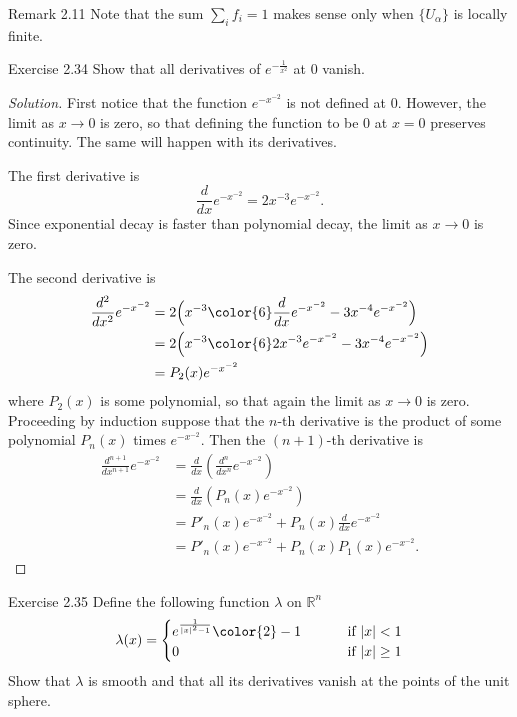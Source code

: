 \begin{thing5}{Remark 2.11}\label{rk:2.11}\leavevmode
Note that the sum \(\sum_if_i=1\) makes sense only when \(\{U_\alpha\}\) is locally finite.
\end{thing5}

\begin{thing4}{Exercise 2.34}\label{exer:2.34}\leavevmode
Show that all derivatives of \(e^{-\frac{1}{x^2}}\) at 0 vanish.
\end{thing4}

\begin{proof}[Solution]\leavevmode
	First notice that the function \(e^{-x^{-2}}\) is not defined at 0. However, the limit as \(x \to 0\) is zero, so that defining the function to be 0 at \(x=0\) preserves continuity. The same will happen with its derivatives.

	The first derivative is
	\[\frac{d}{dx}e^{-x^{-2}}=2x^{-3}e^{-x^{-2}}.\]
Since exponential decay is faster than polynomial decay, the limit as \(x \to 0\) is zero.

	The second derivative is
\begin{align*}
	\frac{d^2}{dx^2}e^{-x^{-2}}&=2\Big(x^{-3}{\color{6}\frac{d}{dx}e^{-x^{-2}}}-3x^{-4}e^{-x^{-2}}\Big)\\
&=2\Big(x^{-3}{\color{6}2x^{-3}e^{-x^{-2}}}-3x^{-4}e^{-x^{-2}}\Big)\\
&=P_2(x)e^{-x^{-2}}
\end{align*}
where \(P_2(x)\) is some polynomial, so that again the limit as \(x \to 0\) is zero. Proceeding by induction suppose that the \(n\)-th derivative is the product of some polynomial \(P_n(x)\) times \(e^{-x^{-2}}\). Then the \((n+1)\)-th derivative is
\begin{align*}
	\frac{d^{n+1}}{dx^{n+1}}e^{-x^{-2}}&=\frac{d}{dx}\left(\frac{d^n}{dx^n}e^{-x^{-2}}\right)\\
&=\frac{d}{dx}\left(P_n(x)e^{-x^{-2}}\right)\\
&=P'_n(x)e^{-x^{-2}}+P_n(x)\frac{d}{dx}e^{-x^{-2}}\\
&=P'_n(x)e^{-x^{-2}}+P_n(x)P_1(x)e^{-x^{-2}}.
\end{align*}
\end{proof}

\begin{thing4}{Exercise 2.35}\label{exer:2.35}\leavevmode
Define the following function \(\lambda\) on \(\mathbb{R}^n\) 
\[\lambda(x)=\begin{cases}
	e^{\frac{1}{|x|^2-1}}{\color{2}-1}\qquad &\text{ if } |x|<1 \\
	0\qquad &\text{ if } |x|\geq 1
\end{cases}\]
Show that \(\lambda\) is smooth and that all its derivatives vanish at the points of the unit sphere.
\end{thing4}

